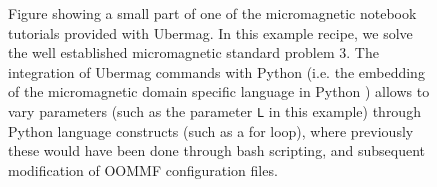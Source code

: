 \documentclass{deliverablereport}
\begin{document}
\begin{figure}
  \centering
  \caption{Figure showing a small part of one of the micromagnetic
    notebook tutorials provided with Ubermag. In this example recipe,
    we solve the well established micromagnetic standard problem 3.
    The integration of Ubermag commands with Python (i.e. the
    embedding of the micromagnetic domain specific language in Python \cite{Beg2017})
    allows to vary parameters (such as the parameter \texttt{L} in this
    example) through Python language constructs (such as a for loop),
    where previously these would have been done through bash
    scripting, and subsequent modification of OOMMF configuration
    files.  }
  \label{fig:demo2}
\end{figure}
\end{document}
